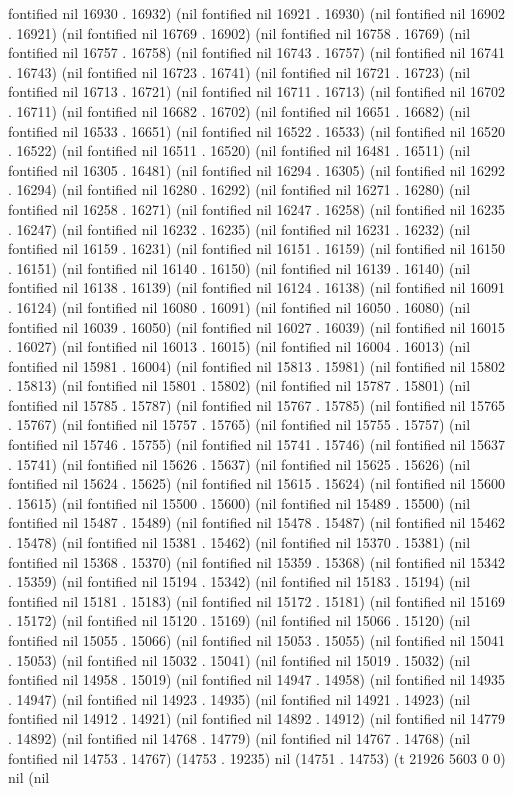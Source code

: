 fontified nil 16930 . 16932) (nil fontified nil 16921 . 16930) (nil fontified nil 16902 . 16921) (nil fontified nil 16769 . 16902) (nil fontified nil 16758 . 16769) (nil fontified nil 16757 . 16758) (nil fontified nil 16743 . 16757) (nil fontified nil 16741 . 16743) (nil fontified nil 16723 . 16741) (nil fontified nil 16721 . 16723) (nil fontified nil 16713 . 16721) (nil fontified nil 16711 . 16713) (nil fontified nil 16702 . 16711) (nil fontified nil 16682 . 16702) (nil fontified nil 16651 . 16682) (nil fontified nil 16533 . 16651) (nil fontified nil 16522 . 16533) (nil fontified nil 16520 . 16522) (nil fontified nil 16511 . 16520) (nil fontified nil 16481 . 16511) (nil fontified nil 16305 . 16481) (nil fontified nil 16294 . 16305) (nil fontified nil 16292 . 16294) (nil fontified nil 16280 . 16292) (nil fontified nil 16271 . 16280) (nil fontified nil 16258 . 16271) (nil fontified nil 16247 . 16258) (nil fontified nil 16235 . 16247) (nil fontified nil 16232 . 16235) (nil fontified nil 16231 . 16232) (nil fontified nil 16159 . 16231) (nil fontified nil 16151 . 16159) (nil fontified nil 16150 . 16151) (nil fontified nil 16140 . 16150) (nil fontified nil 16139 . 16140) (nil fontified nil 16138 . 16139) (nil fontified nil 16124 . 16138) (nil fontified nil 16091 . 16124) (nil fontified nil 16080 . 16091) (nil fontified nil 16050 . 16080) (nil fontified nil 16039 . 16050) (nil fontified nil 16027 . 16039) (nil fontified nil 16015 . 16027) (nil fontified nil 16013 . 16015) (nil fontified nil 16004 . 16013) (nil fontified nil 15981 . 16004) (nil fontified nil 15813 . 15981) (nil fontified nil 15802 . 15813) (nil fontified nil 15801 . 15802) (nil fontified nil 15787 . 15801) (nil fontified nil 15785 . 15787) (nil fontified nil 15767 . 15785) (nil fontified nil 15765 . 15767) (nil fontified nil 15757 . 15765) (nil fontified nil 15755 . 15757) (nil fontified nil 15746 . 15755) (nil fontified nil 15741 . 15746) (nil fontified nil 15637 . 15741) (nil fontified nil 15626 . 15637) (nil fontified nil 15625 . 15626) (nil fontified nil 15624 . 15625) (nil fontified nil 15615 . 15624) (nil fontified nil 15600 . 15615) (nil fontified nil 15500 . 15600) (nil fontified nil 15489 . 15500) (nil fontified nil 15487 . 15489) (nil fontified nil 15478 . 15487) (nil fontified nil 15462 . 15478) (nil fontified nil 15381 . 15462) (nil fontified nil 15370 . 15381) (nil fontified nil 15368 . 15370) (nil fontified nil 15359 . 15368) (nil fontified nil 15342 . 15359) (nil fontified nil 15194 . 15342) (nil fontified nil 15183 . 15194) (nil fontified nil 15181 . 15183) (nil fontified nil 15172 . 15181) (nil fontified nil 15169 . 15172) (nil fontified nil 15120 . 15169) (nil fontified nil 15066 . 15120) (nil fontified nil 15055 . 15066) (nil fontified nil 15053 . 15055) (nil fontified nil 15041 . 15053) (nil fontified nil 15032 . 15041) (nil fontified nil 15019 . 15032) (nil fontified nil 14958 . 15019) (nil fontified nil 14947 . 14958) (nil fontified nil 14935 . 14947) (nil fontified nil 14923 . 14935) (nil fontified nil 14921 . 14923) (nil fontified nil 14912 . 14921) (nil fontified nil 14892 . 14912) (nil fontified nil 14779 . 14892) (nil fontified nil 14768 . 14779) (nil fontified nil 14767 . 14768) (nil fontified nil 14753 . 14767) (14753 . 19235) nil (14751 . 14753) (t 21926 5603 0 0) nil (nil 